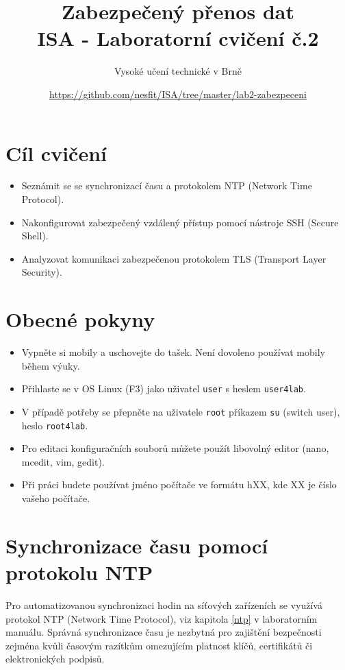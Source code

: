 \documentclass[a4paper,11pt]{article}
\title{Zabezpečený přenos dat\\
{\bf\large ISA - Laboratorní cvičení č.2}}
\author{Vysoké učení technické v Brně}
\date{\url{https://github.com/nesfit/ISA/tree/master/lab2-zabezpeceni}}
\begin{document}
{\let\newpage\relax\maketitle}

\section*{Cíl cvičení}
\begin{itemize}
  \item Seznámit se se synchronizací času a protokolem NTP (Network Time Protocol).
  \item Nakonfigurovat zabezpečený vzdálený přístup pomocí nástroje SSH (Secure Shell).
  \item Analyzovat komunikaci zabezpečenou protokolem TLS (Transport Layer Security).
\end{itemize}

\section*{Obecné pokyny}
\begin{itemize}
  \item Vypněte si mobily a uschovejte do tašek. Není dovoleno používat mobily během výuky. 
  \item Přihlaste se v OS Linux (F3) jako uživatel {\tt user} s heslem {\tt user4lab}.
  \item V případě potřeby se přepněte na uživatele {\tt root} příkazem {\tt su}
  (switch user), heslo {\tt root4lab}.
  \item Pro editaci konfiguračních souborů můžete použít libovolný editor (nano, mcedit, vim, gedit).
  \item Při práci budete používat jméno počítače ve formátu hXX, kde XX je číslo vašeho počítače.
\end{itemize}

\section{Synchronizace času pomocí protokolu NTP}
Pro automatizovanou synchronizaci hodin na síťových zařízeních se využívá protokol NTP (Network Time Protocol), viz kapitola \ref{ntp} v laboratorním manuálu. Správná synchronizace  času je nezbytná pro zajištění bezpečnosti zejména kvůli časovým razítkům omezujícím platnost klíčů, certifikátů či elektronických podpisů.
\end{document}
